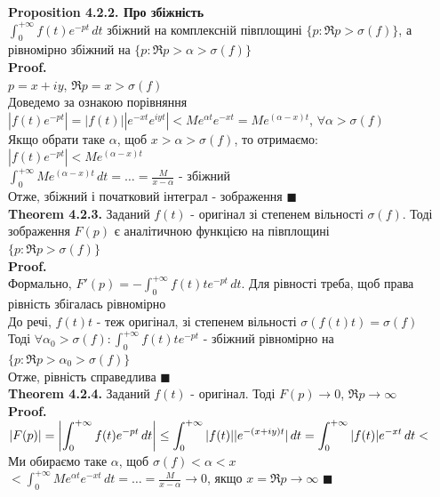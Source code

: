\documentclass{math_library}
\begin{document}
\textbf{Proposition 4.2.2. Про збіжність}\\
$\displaystyle \int_0^{+\infty} f(t)e^{-pt}\,dt$ збіжний на комплексній півплощині $\{p: \Re p>\sigma(f)\}$, а рівномірно збіжний на $\{p: \Re p>\alpha>\sigma(f)\}$\\
\textbf{Proof.}\\
$p = x + iy$, $\Re p = x > \sigma(f)$\\
Доведемо за ознакою порівняння\\
$|f(t)e^{-pt}| = |f(t)| |e^{-xt}e^{iyt}| < Me^{\alpha t} e^{-xt} = Me^{(\alpha - x)t}$, $\forall \alpha > \sigma(f)$\\
Якщо обрати таке $\alpha$, щоб $x>\alpha>\sigma(f)$, то отримаємо:\\
$|f(t)e^{-pt}| < Me^{(\alpha-x)t}$\\
$\displaystyle \int_0^{+\infty} Me^{(\alpha-x)t}\,dt = \dots = \frac{M}{x-\alpha}$ - збіжний\\
Отже, збіжний і початковий інтеграл - зображення $\blacksquare$
\bigskip \\
\textbf{Theorem 4.2.3.} Заданий $f(t)$ - оригінал зі степенем вільності $\sigma(f)$. Тоді зображення $F(p)$ є аналітичною функцією на півплощині \\ $\{p: \Re p>\sigma(f)\}$\\
\textbf{Proof.}\\
Формально, $F'(p) = \displaystyle -\int_0^{+\infty} f(t) t e^{-pt}\,dt$. Для рівності треба, щоб права рівність збігалась рівномірно\\
До речі, $f(t)t$ - теж оригінал, зі степенем вільності $\sigma(f(t)t)=\sigma(f)$\\
Тоді $\forall \alpha_0 > \sigma(f): \displaystyle \int_0^{+\infty} f(t)te^{-pt}$ - збіжний рівномірно на $\{p: \Re p > \alpha_0 > \sigma(f) \}$\\
Отже, рівність справедлива $\blacksquare$
\bigskip \\
\textbf{Theorem 4.2.4.} Заданий $f(t)$ - оригінал. Тоді $F(p) \to 0$, $\Re p \to \infty$\\
\textbf{Proof.}\\
$|F(p)| = \displaystyle \abs{\int_0^{+\infty} f(t)e^{-pt}\,dt} \leq \int_0^{+\infty} |f(t)| |e^{-(x+iy)t}| \,dt = \int_0^{+\infty} |f(t)|e^{-xt}\,dt <$\\
Ми обираємо таке $\alpha$, щоб $\sigma(f) < \alpha < x$\\
$< \displaystyle \int_0^{+\infty} Me^{\alpha t} e^{-xt}\,dt = \dots = \frac{M}{x-\alpha} \to 0$, якщо $x = \Re p \to \infty$ $\blacksquare$
\end{document}
